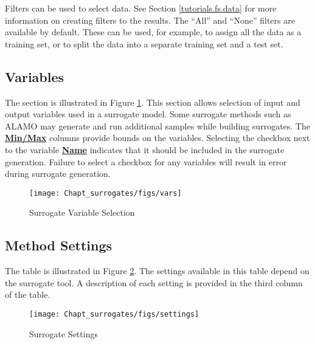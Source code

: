 Filters can be used to select data. See Section
\ref{tutorials.fs.data} for more information on creating filters to the results.
The ``All'' and ``None'' filters are available by default. These can be
used, for example, to assign all the data as a training set, or to split
the data into a separate training set and a test set.

\subsection{Variables}

The  section is illustrated in Figure
\ref{fig.surrogate.vars}.  This section allows selection of input and
output variables used in a surrogate model.  Some surrogate methods such as ALAMO may generate and run additional samples while building surrogates.
The \textbf{\underline{Min/Max}} columns provide bounds on the variables. Selecting the checkbox next to the variable \textbf{\underline{Name}} indicates that it should be included in the surrogate generation. Failure to select a checkbox for any variables will result in error during surrogate generation.

\begin{figure}[H]
	\begin{center}
		\texttt{[image: Chapt\_surrogates/figs/vars]}
		\caption{Surrogate Variable Selection}
		\label{fig.surrogate.vars}
	\end{center}
\end{figure}

\subsection{Method Settings}

The  table is illustrated in Figure
\ref{fig.surrogate.settings}.  The settings available in this table depend on the surrogate tool. A description of each setting is provided in the third column of the table.
\begin{figure}[H]
	\begin{center}
		\texttt{[image: Chapt\_surrogates/figs/settings]}
		\caption{Surrogate Settings}
		\label{fig.surrogate.settings}
	\end{center}
\end{figure}

